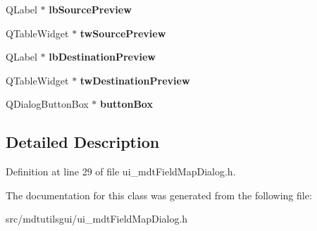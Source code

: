 \begin{DoxyCompactItemize}
\item 
\hypertarget{class_ui__mdt_field_map_dialog_a3248ea0ebd503efd35f27776d92fc78a}{
QLabel $\ast$ {\bfseries lbSourcePreview}}
\label{class_ui__mdt_field_map_dialog_a3248ea0ebd503efd35f27776d92fc78a}

\item 
\hypertarget{class_ui__mdt_field_map_dialog_a4359b329034b12ab48019d873f1176f0}{
QTableWidget $\ast$ {\bfseries twSourcePreview}}
\label{class_ui__mdt_field_map_dialog_a4359b329034b12ab48019d873f1176f0}

\item 
\hypertarget{class_ui__mdt_field_map_dialog_aba3f44c01ed87ecf11f384c29d20bf65}{
QLabel $\ast$ {\bfseries lbDestinationPreview}}
\label{class_ui__mdt_field_map_dialog_aba3f44c01ed87ecf11f384c29d20bf65}

\item 
\hypertarget{class_ui__mdt_field_map_dialog_afe906fa26ad8f24ee89ddca43d00dcce}{
QTableWidget $\ast$ {\bfseries twDestinationPreview}}
\label{class_ui__mdt_field_map_dialog_afe906fa26ad8f24ee89ddca43d00dcce}

\item 
\hypertarget{class_ui__mdt_field_map_dialog_a2ff1c455b47f9ffaea9aea9261cf97ab}{
QDialogButtonBox $\ast$ {\bfseries buttonBox}}
\label{class_ui__mdt_field_map_dialog_a2ff1c455b47f9ffaea9aea9261cf97ab}

\end{DoxyCompactItemize}


\subsection{Detailed Description}


Definition at line 29 of file ui\_\-mdtFieldMapDialog.h.



The documentation for this class was generated from the following file:\begin{DoxyCompactItemize}
\item 
src/mdtutilsgui/ui\_\-mdtFieldMapDialog.h\end{DoxyCompactItemize}
